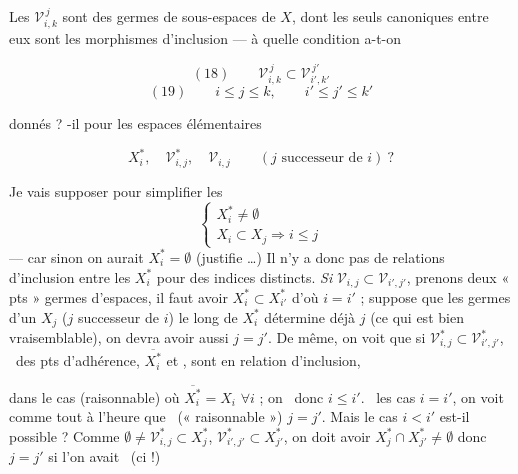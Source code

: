 \documentclass[11pt,a4paper]{article}
\begin{document}
Les $\mathcal{V}^{\,j}_{i,k}$ sont des germes de sous-espaces de $X$, dont les
seuls   canoniques entre eux sont
les morphismes d'inclusion — à quelle condition a-t-on

\[
  (18) \qquad \mathcal{V}^{\,j}_{i,k} \subset \mathcal{V}^{\,j'}_{i',k'}
\]
\[
  (19) \qquad i \leq j \leq k , \qquad i' \leq j' \leq k'
\]

donnés ? -il pour les espaces élémentaires

\[
  X_i^{*} , \quad \mathcal{V}^{*}_{i,j} , \quad \mathcal{V}_{i,j}
  \qquad (j \text{ successeur de } i) \ ?
\]

 Je vais supposer pour simplifier les
\[
  \begin{cases}
    X_i^{*} \neq \emptyset \\
    X_i \subset X_j \Rightarrow i \leq j
  \end{cases}
\]
— car sinon on aurait $X_i^{*} = \emptyset$ (justifie …) Il n'y a donc pas
de relations d'inclusion entre les $X_i^{*}$ pour des indices distincts.
\emph{Si}  $\mathcal{V}_{i,j} \subset \mathcal{V}_{i',j'}$,
prenons deux « pts »   germes d'espaces, il faut avoir
$X_i^{*} \subset X_{i'}^{*}$ d'où $i = i'$ ;  suppose que les
germes d'un $X_j$ ($j$ successeur de $i$) le long de $X_i^{*}$ détermine
déjà $j$ (ce qui est bien vraisemblable), on devra
avoir aussi $j = j'$. De même, on voit que si
$\mathcal{V}^{*}_{i,j} \subset \mathcal{V}^{*}_{i',j'}$, \ des pts
d'adhérence,   $\overline{X_i^{*}}$ et 
, sont en relation d'inclusion,


dans le cas (raisonnable) où $\overline{X_i^{*}} = X_i$ $\forall i$ ; on \ill\
donc $i \leq i'$.  \ill\ les cas $i = i'$, on voit comme
tout à l'heure que \ill\ (« raisonnable ») $j = j'$. Mais le cas $i < i'$
est-il possible ? Comme
$\emptyset \neq \mathcal{V}^{*}_{i,j} \subset X_j^{*}$,
$\mathcal{V}^{*}_{i',j'} \subset X_{j'}^{*}$, on doit avoir
$X_j^{*} \cap X_{j'}^{*} \neq \emptyset$ donc $j = j'$ si l'on avait \ill\
(ci !)
\end{document}
